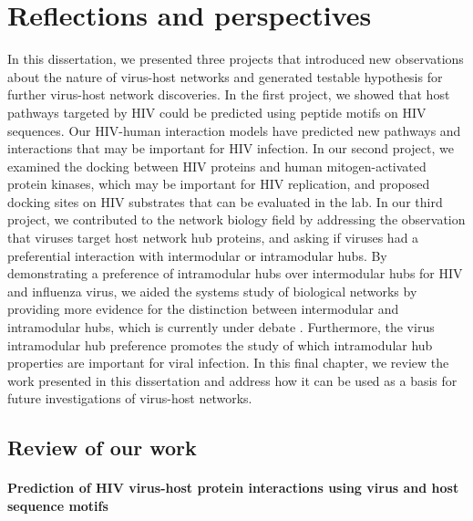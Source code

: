 \chapter{Reflections and perspectives} \label{chapter:conclusion}

In this dissertation, we presented three projects that introduced new
observations about the nature of virus-host networks and generated
testable hypothesis for further virus-host network discoveries. In the
first project, we showed that host pathways targeted by HIV could be
predicted using peptide motifs on HIV sequences. Our HIV-human
interaction models have predicted new pathways and interactions that
may be important for HIV infection. In our second project, we examined
the docking between HIV proteins and human mitogen-activated protein
kinases, which may be important for HIV replication, and proposed
docking sites on HIV substrates that can be evaluated in the lab. In
our third project, we contributed to the network biology field by
addressing the observation that viruses target host network hub
proteins, and asking if viruses had a preferential interaction with
intermodular or intramodular hubs. By demonstrating a preference of
intramodular hubs over intermodular hubs for HIV and influenza virus,
we aided the systems study of biological networks by providing more
evidence for the distinction between intermodular and intramodular
hubs, which is currently under debate
\cite{taylor09,batada06,batada07,agarwal09,han04}. Furthermore,
the virus intramodular hub preference promotes the study of which
intramodular hub properties are important for viral infection. In this
final chapter, we review the work presented in this dissertation and
address how it can be used as a basis for future investigations of
virus-host networks.


\section{Review of our work}

\subsubsection{Prediction of HIV virus-host protein interactions using virus and host sequence motifs}

